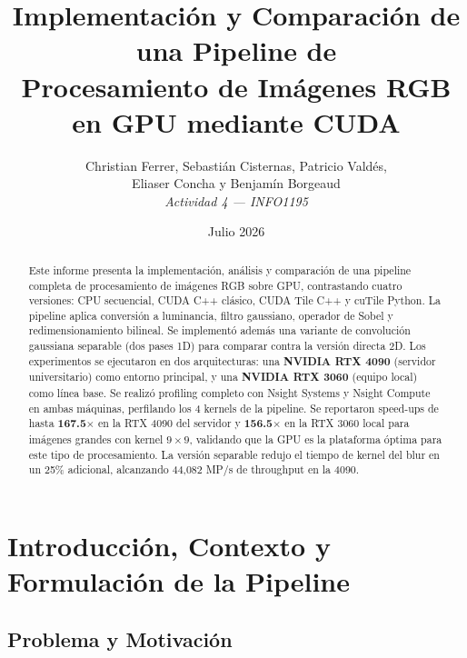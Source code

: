 \documentclass[12pt,a4paper]{article}
\title{\textbf{Implementaci\'on y Comparaci\'on de una Pipeline de\\ Procesamiento de Im\'agenes RGB en GPU mediante CUDA}}
\author{
  Christian Ferrer, Sebasti\'an Cisternas, Patricio Vald\'es, \\
  Eliaser Concha y Benjam\'in Borgeaud \\
  \vspace{0.3cm}
  \textit{Actividad 4 --- INFO1195}
}
\date{Julio 2026}
\begin{document}
\maketitle
\thispagestyle{empty}

\begin{abstract}
Este informe presenta la implementaci\'on, an\'alisis y comparaci\'on de una pipeline completa de procesamiento de im\'agenes RGB sobre GPU, contrastando cuatro versiones: CPU secuencial, CUDA C++ cl\'asico, CUDA Tile C++ y cuTile Python. La pipeline aplica conversi\'on a luminancia, filtro gaussiano, operador de Sobel y redimensionamiento bilineal. Se implement\'o adem\'as una variante de convoluci\'on gaussiana separable (dos pases 1D) para comparar contra la versi\'on directa 2D. Los experimentos se ejecutaron en dos arquitecturas: una \textbf{NVIDIA RTX 4090} (servidor universitario) como entorno principal, y una \textbf{NVIDIA RTX 3060} (equipo local) como l\'inea base. Se realiz\'o profiling completo con Nsight Systems y Nsight Compute en ambas m\'aquinas, perfilando los 4 kernels de la pipeline. Se reportaron speed-ups de hasta \textbf{167.5$\times$} en la RTX 4090 del servidor y \textbf{156.5$\times$} en la RTX 3060 local para im\'agenes grandes con kernel $9 \times 9$, validando que la GPU es la plataforma \'optima para este tipo de procesamiento. La versi\'on separable redujo el tiempo de kernel del blur en un 25\% adicional, alcanzando 44,082 MP/s de throughput en la 4090.
\end{abstract}

\newpage
\tableofcontents
\newpage

\section{Introducci\'on, Contexto y Formulaci\'on de la Pipeline}

\subsection{Problema y Motivaci\'on}

\end{document}
